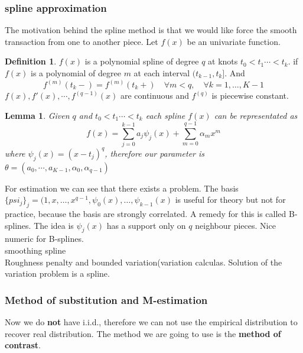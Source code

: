 \documentclass[a4paper,12pt, oneside, fleqn]{book}
\newtheorem{lemma}[theorem]{Lemma}
\theoremstyle{definition}
\newtheorem{definition}{Definition}[section]
\theoremstyle{remark}
\begin{document}
\subsubsection*{spline approximation}	
The motivation behind the spline method is that we would like force the smooth transaction from one to another piece. Let $f(x)$ be an univariate function.
\begin{definition}
	$f(x)$ is a polynomial spline of degree $q$ at knots $t_0 < t_1 \cdots < t_k$. if $f(x)$ is a polynomial of degree $m$ at each interval $(t_{k-1}, t_k]$. And 
	\begin{equation*}
		f^{(m)} (t_k - ) = f^{(m)} (t_k + ) \quad \forall m < q, \quad \forall k = 1, \dots, K - 1
	\end{equation*}
	$f(x), f'(x), \cdots, f^{(q-1)}(x)$ are continuous and $f^{(q)}$ is piecewise constant.
\end{definition}

\begin{lemma}
	Given $q$ and $t_0 < t_1 \cdots < t_k$ each spline $f(x)$ can be representated as 
	\begin{equation}
		f(x) = \sum_{j = 0}^{k - 1} a_j \psi_j(x) + \sum_{m = 0}^{q - 1} \alpha_m x^m
	\end{equation}
	where $\psi_j(x) = (x - t_j)^q $, therefore our parameter is $\theta = (a_0, \cdots, a_{K- 1}, \alpha_0, \alpha_{q-1})$
\end{lemma}

For estimation we can see that there exists a problem. The basis $\{psi_j\}_j = (1, x, \dots, x^{q - 1}, \psi_0(x), \dots, \psi_{k-1}(x)$ is useful for theory but not for practice, because the basis are strongly correlated. A remedy for this is called B-splines. The idea is $\psi_j(x)$ has a support only on $q$ neighbour pieces. Nice numeric for B-splines.\\
smoothing spline\\
Roughness penalty and bounded variation(variation calculas. Solution of the variation problem is a spline.

\subsubsection{Method of substitution and M-estimation}
Now we do \textbf{not} have i.i.d., therefore we can not use the empirical distribution to recover real distribution. The method we are going to use is the \textbf{method of contrast}.\par 
\end{document}
